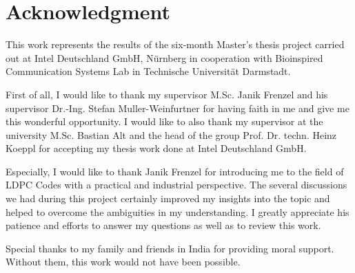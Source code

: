 \chapter*{Acknowledgment}
This work represents the results of the six-month Master’s thesis project carried out at Intel Deutschland GmbH, Nürnberg in cooperation with Bioinspired Communication Systems Lab in Technische Universität Darmstadt.

First of all, I would like to thank my supervisor M.Sc. Janik Frenzel and his supervisor Dr.-Ing. Stefan Muller-Weinfurtner for having faith in me and give me this wonderful opportunity. I would like to also thank my supervisor at the university M.Sc. Bastian Alt and the head of the group Prof. Dr. techn. Heinz Koeppl for accepting my thesis work done at Intel Deutschland GmbH.

Especially, I would like to thank Janik Frenzel for introducing me to the field of LDPC Codes with a practical and industrial perspective. The several discussions we had during this project certainly improved my insights into the topic and helped to overcome the ambiguities in my understanding. I greatly appreciate his patience and efforts to answer my questions as well as to review this work.

Special thanks to my family and friends in India for providing moral support. Without them, this work would not have been possible.



